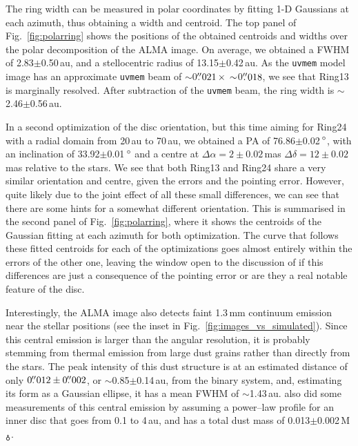 \documentclass[fleqn,usenatbib,useAMS]{mnras}
\begin{document}
The ring width can be measured in polar coordinates by fitting 1-D Gaussians at each azimuth, thus obtaining a width and centroid. The top panel of Fig.~\ref{fig:polarring} shows the positions of the obtained centroids and widths over the polar decomposition of the ALMA image. On average, we obtained a FWHM of 2.83$\pm$0.50\,au, and a stellocentric radius of 13.15$\pm$0.42\,au. As the {\tt uvmem} model image has an approximate {\tt uvmem} beam of $\sim$0$\hbox{$.\!\!^{\prime\prime}$}021 \,\times \,\sim$0$\hbox{$.\!\!^{\prime\prime}$}018$, we see that Ring13 is marginally resolved. After subtraction of the {\tt uvmem} beam, the ring width is $\sim$2.46$\pm$0.56\,au.

In a second optimization of the disc orientation, but this time aiming for Ring24 with a radial domain from 20\,au to 70\,au, we obtained a PA of 76.86$\pm$0.02\,$\hbox{$^\circ$}$, with an inclination of 33.92$\pm$0.01\,$\hbox{$^\circ$}$ and a centre at $\Delta \alpha = 2\pm0.02$\,mas $\Delta \delta = 12\pm0.02$\,mas relative to the stars. We see that both Ring13 and Ring24 share a very similar orientation and centre, given the errors and the pointing error. However, quite likely due to the joint effect of all these small differences, we can see that there are some hints for a somewhat different orientation. This is summarised in the second panel of Fig.~\ref{fig:polarring}, where it shows the centroids of the Gaussian fitting at each azimuth for both optimization. The curve that follows these fitted centroids for each of the optimizations goes almost entirely within the errors of the other one, leaving the window open to the discussion of if this differences are just a consequence of the pointing error or are they a real notable feature of the disc.

Interestingly, the ALMA image also detects faint 1.3\,mm continuum emission near the stellar positions (see the inset in Fig.~\ref{fig:images_vs_simulated}). Since this central emission is larger than the angular resolution, it is probably stemming from thermal emission from large dust grains rather than directly from the stars. The peak intensity of this dust structure is at an estimated distance of only $0\hbox{$.\!\!^{\prime\prime}$}012\pm0\hbox{$.\!\!^{\prime\prime}$}002$, or $\sim$0.85$\pm$0.14\,au, from the binary system, and, estimating its form as a Gaussian ellipse, it has a mean FWHM of $\sim$1.43\,au. \citet{Francis_2020} also did some measurements of this central emission by assuming a power--law profile for an inner disc that goes from 0.1 to 4\,au, and has a total dust mass of 0.013$\pm$0.002\,M$_{\earth}$.
\end{document}
